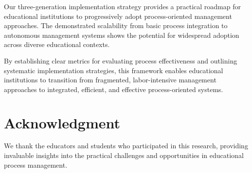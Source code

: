 \documentclass[conference]{IEEEtran}
\begin{document}
Our three-generation implementation strategy provides a practical roadmap for educational institutions to progressively adopt process-oriented management approaches. The demonstrated scalability from basic process integration to autonomous management systems shows the potential for widespread adoption across diverse educational contexts.

By establishing clear metrics for evaluating process effectiveness and outlining systematic implementation strategies, this framework enables educational institutions to transition from fragmented, labor-intensive management approaches to integrated, efficient, and effective process-oriented systems.

\section*{Acknowledgment}

We thank the educators and students who participated in this research, providing invaluable insights into the practical challenges and opportunities in educational process management.

\vspace{-10mm}


\end{document}
